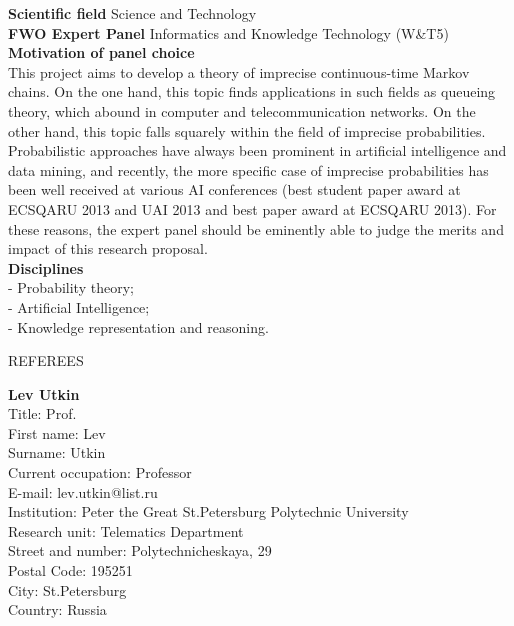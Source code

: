 \documentclass[11pt,dvipsnames,usenames,a4paper]{article}
\begin{document}
{\bf Scientific field} \tab Science and Technology \\
{\bf FWO Expert Panel} \tab Informatics and Knowledge Technology (W\&T5) \\[8pt]
{\bf Motivation of panel choice}\\[6pt]
This project aims to develop a theory of imprecise continuous-time Markov chains. On the one hand, this topic finds applications in such fields as queueing theory, which abound in computer and telecommunication networks. On the other hand, this topic falls squarely within the field of imprecise probabilities. Probabilistic approaches have always been prominent in artificial intelligence and data mining, and recently, the more specific case of imprecise probabilities has been well received at various AI conferences (best student paper award at ECSQARU 2013 and UAI 2013 and best paper award at ECSQARU 2013). For these reasons, the expert panel should be eminently able to judge the merits and impact of this research proposal.\\[8pt]
{\bf Disciplines}\\[6pt]
- Probability theory;\\
- Artificial Intelligence;\\
- Knowledge representation and reasoning.



\vspace{5mm}

\begin{shaded}\centering REFEREES \end{shaded}

\vspace{5pt}

{\bf Lev Utkin}\\
Title: Prof.\\
First name: Lev\\
Surname:  Utkin \\
Current occupation: Professor\\
E-mail: lev.utkin@list.ru\\
Institution: Peter the Great St.Petersburg Polytechnic University\\
Research unit: Telematics Department\\
Street and number: Polytechnicheskaya, 29\\
Postal Code: 195251\\
City: St.Petersburg\\
Country: Russia\\[-7pt]
\end{document}
